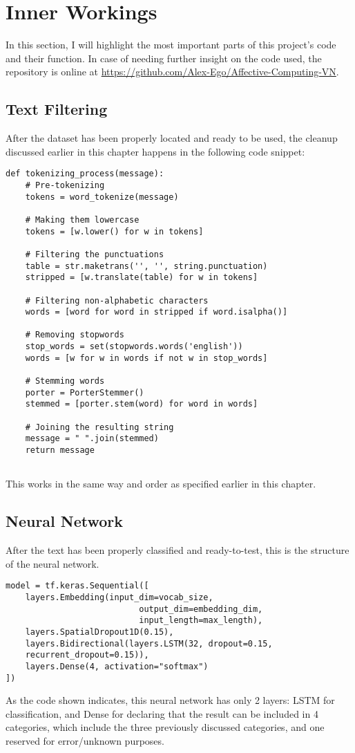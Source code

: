 \section{Inner Workings}
In this section, I will highlight the most important parts of this project's code and their function. In case of needing further insight on the code used, the repository is online at \url{https://github.com/Alex-Ego/Affective-Computing-VN}.
\subsection{Text Filtering}
After the dataset has been properly located and ready to be used, the cleanup discussed earlier in this chapter happens in the following code snippet:
\begin{lstlisting}
def tokenizing_process(message):
    # Pre-tokenizing
    tokens = word_tokenize(message)
    
    # Making them lowercase
    tokens = [w.lower() for w in tokens]
    
    # Filtering the punctuations
    table = str.maketrans('', '', string.punctuation)
    stripped = [w.translate(table) for w in tokens]
    
    # Filtering non-alphabetic characters
    words = [word for word in stripped if word.isalpha()]
    
    # Removing stopwords
    stop_words = set(stopwords.words('english'))
    words = [w for w in words if not w in stop_words]
    
    # Stemming words
    porter = PorterStemmer()
    stemmed = [porter.stem(word) for word in words]
    
    # Joining the resulting string
    message = " ".join(stemmed)
    return message
    
\end{lstlisting}
This works in the same way and order as specified earlier in this chapter.
\subsection{Neural Network}
After the text has been properly classified and ready-to-test, this is the structure of the neural network.
\begin{lstlisting}
model = tf.keras.Sequential([
    layers.Embedding(input_dim=vocab_size, 
                           output_dim=embedding_dim, 
                           input_length=max_length),
    layers.SpatialDropout1D(0.15),
    layers.Bidirectional(layers.LSTM(32, dropout=0.15, 
    recurrent_dropout=0.15)),
    layers.Dense(4, activation="softmax")
])
\end{lstlisting} 
As the code shown indicates, this neural network has only 2 layers: LSTM for classification, and Dense for declaring that the result can be included in 4 categories, which include the three previously discussed categories, and one reserved for error/unknown purposes.
